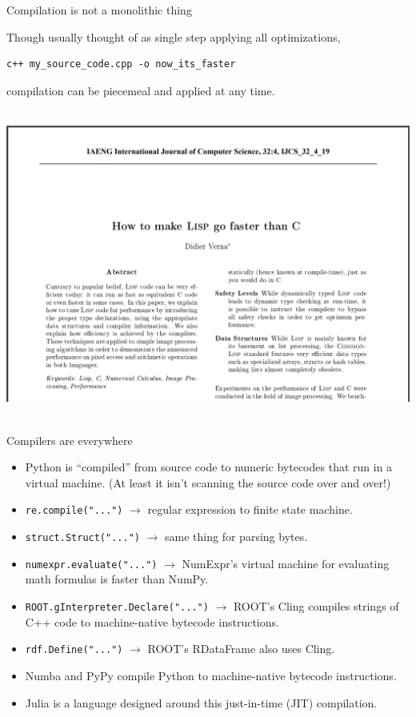 \documentclass[aspectratio=169]{beamer}
\begin{document}
\begin{frame}[fragile]{Compilation is not a monolithic thing}
\Large

\vspace{0.5 cm}
Though usually thought of as single step applying all optimizations,

\vspace{0.2 cm}
\hspace{0.6 cm} \begin{minipage}{0.9\linewidth}
\begin{verbatim}
c++ my_source_code.cpp -o now_its_faster
\end{verbatim}
\end{minipage}

\vspace{0.25 cm}
compilation can be piecemeal and applied at any time.

\vspace{0.5 cm}

\mbox{ } \hfill \includegraphics[height=5 cm]{lisp-faster-than-c.png} \hfill \mbox{ }
\end{frame}

\begin{frame}{Compilers are everywhere}
\large
\vspace{0.35 cm}

\begin{itemize}\setlength{\itemsep}{0.27 cm}
\item Python is ``compiled'' from source code to numeric bytecodes that run in a virtual machine. (At least it isn't scanning the source code over and over!)
\item \texttt{re.compile("...")} $\longrightarrow$ regular expression to finite state machine.
\item \texttt{struct.Struct("...")} $\longrightarrow$ same thing for parsing bytes.
\item \texttt{numexpr.evaluate("...")} $\longrightarrow$ NumExpr's virtual machine for evaluating math formulas is faster than NumPy.
\item \texttt{ROOT.gInterpreter.Declare("...")} $\longrightarrow$ ROOT's Cling compiles strings of C++ code to machine-native bytecode instructions.
\item \texttt{rdf.Define("...")} $\longrightarrow$ ROOT's RDataFrame also uses Cling.
\item Numba and PyPy compile Python to machine-native bytecode instructions.
\item Julia is a language designed around this just-in-time (JIT) compilation.
\end{itemize}
\end{frame}
\end{document}

